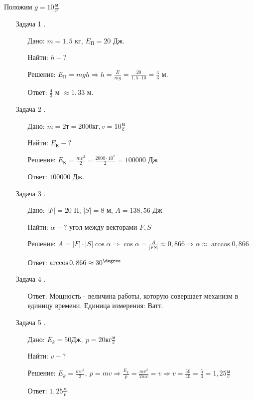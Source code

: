 \documentclass[12pt, letterpaper, twoside]{article}
\begin{document}
    Положим $g = 10\frac{\text{м}}{\text{с}^2}$\\
    \begin{enumerate}
        \item[Задача 1].
        \begin{enumerate}
            \item[Дано:] $m = 1,5$ кг, $E_{\text{П}} = 20$ Дж.
            \item[Найти:] $h - ?$
            \item[Решение:] $E_{\text{П}} = mgh\Rightarrow h = \frac{E}{mg} = \frac{20}{1,5\cdot 10} = \frac{4}{3}$ м.
            \item[Ответ:] $\frac{4}{3}$ м $\approx 1,33$ м.  
        \end{enumerate}
        \item[Задача 2].
        \begin{enumerate}
            \item[Дано:] $m = 2\text{т} = 2000 \text{кг}, v = 10\frac{\text{м}}{\text{с}}$
            \item[Найти:] $E_{\text{К}} - ?$
            \item[Решение:] $E_{\text{К}} = \frac{mv^2}{2} = \frac{2000\cdot 10^2}{2} = 100000$ Дж
            \item[Ответ:] $100000$ Дж.    
        \end{enumerate}
        \item[Задача 3].
        \begin{enumerate}
            \item[Дано:] $|F| = 20$ Н, $|S|=8$ м, $A = 138,56$ Дж
            \item[Найти:] $\alpha - ?$ угол между векторами $F, S$
            \item[Решение:] $A = |F|\cdot|S|\cos \alpha\Rightarrow \cos\alpha = \frac{A}{|FS|}\approx 0,866\Rightarrow \alpha \approx \arccos 0,866$
            \item[Ответ:] $\arccos 0,866 \approx 30^\degree$    
        \end{enumerate}
        \item[Задача 4].
        \begin{enumerate}
            \item[Ответ:] Мощность - величина работы, которую совершает механизм в единицу времени. Единица измерения: Ватт.    
        \end{enumerate}
        \item[Задача 5].
        \begin{enumerate}
            \item[Дано:] $E_k = 50 \text{Дж},\ p = 20 \text{кг}\frac{\text{м}}{\text{с}}$
            \item[Найти:] $v - ?$
            \item[Решение:] $E_k = \frac{mv^2}{2},\ p = mv\Rightarrow \frac{E_k}{p} = \frac{mv^2}{2mv} = v\Rightarrow v = \frac{50}{40} = \frac{5}{4} = 1,25\frac{\text{м}}{\text{с}}$
            \item[Ответ:] $1,25\frac{\text{м}}{\text{с}}$
        \end{enumerate}
    \end{enumerate}
\end{document}
